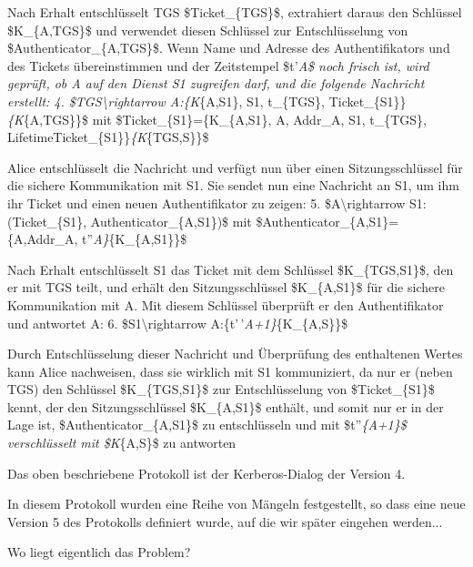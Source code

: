 \documentclass[a4paper]{article}
\begin{document}
\begin{multicols}{3}
\begin{itemize*}
            \item Nach Erhalt entschlüsselt TGS \$Ticket\_\{TGS\}\$, extrahiert daraus
            den Schlüssel \$K\_\{A,TGS\}\$ und verwendet diesen Schlüssel zur
            Entschlüsselung von \$Authenticator\_\{A,TGS\}\$. Wenn Name und
            Adresse des Authentifikators und des Tickets übereinstimmen und der
            Zeitstempel \$t'\emph{A\$ noch frisch ist, wird geprüft, ob A auf den
                  Dienst S1 zugreifen darf, und die folgende Nachricht erstellt: 4.
                  \$TGS\textbackslash rightarrow A:\{K}\{A,S1\}, S1, t\_\{TGS\},
            Ticket\_\{S1\}\}\emph{\{K}\{A,TGS\}\}\$ mit
            \$Ticket\_\{S1\}=\{K\_\{A,S1\}, A, Addr\_A, S1, t\_\{TGS\},
            LifetimeTicket\_\{S1\}\}\emph{\{K}\{TGS,S\}\}\$
            \item Alice entschlüsselt die Nachricht und verfügt nun über einen
            Sitzungsschlüssel für die sichere Kommunikation mit S1. Sie sendet nun
            eine Nachricht an S1, um ihm ihr Ticket und einen neuen
            Authentifikator zu zeigen: 5. \$A\textbackslash rightarrow
            S1:(Ticket\_\{S1\}, Authenticator\_\{A,S1\})\$ mit
            \$Authenticator\_\{A,S1\}=\{A,Addr\_A, t''\emph{A\}}\{K\_\{A,S1\}\}\$
            \item Nach Erhalt entschlüsselt S1 das Ticket mit dem Schlüssel
            \$K\_\{TGS,S1\}\$, den er mit TGS teilt, und erhält den
            Sitzungsschlüssel \$K\_\{A,S1\}\$ für die sichere Kommunikation mit A.
            Mit diesem Schlüssel überprüft er den Authentifikator und antwortet A:
            6. \$S1\textbackslash rightarrow A:\{t'\,'\emph{A+1\}}\{K\_\{A,S\}\}\$
            \item Durch Entschlüsselung dieser Nachricht und Überprüfung des enthaltenen
            Wertes kann Alice nachweisen, dass sie wirklich mit S1 kommuniziert,
            da nur er (neben TGS) den Schlüssel \$K\_\{TGS,S1\}\$ zur
            Entschlüsselung von \$Ticket\_\{S1\}\$ kennt, der den
            Sitzungsschlüssel \$K\_\{A,S1\}\$ enthält, und somit nur er in der
            Lage ist, \$Authenticator\_\{A,S1\}\$ zu entschlüsseln und mit
            \$t''\emph{\{A+1\}\$ verschlüsselt mit \$K}\{A,S\}\$ zu antworten
            \item Das oben beschriebene Protokoll ist der Kerberos-Dialog der Version 4.
            \begin{itemize*}
                  \item In diesem Protokoll wurden eine Reihe von Mängeln festgestellt, so dass eine neue Version 5 des Protokolls definiert wurde, auf die wir später eingehen werden...
                  \item Wo liegt eigentlich das Problem?
            \end{itemize*}
      \end{itemize*}



\end{multicols}
\end{document}
